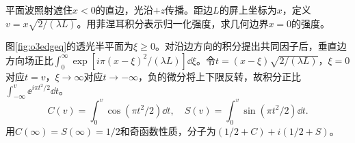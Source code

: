 \begin{example}\label{ex:o3edge}
平面波照射遮住$x<0$的直边，光沿$+z$传播。距边$L$的屏上坐标为$x$，定义$v=x\sqrt{2/(\lambda L)}$。用菲涅耳积分表示归一化强度，求几何边界$x=0$的强度。
\end{example}
\begin{solution}
图\ref{fig:o3edgeq}的透光半平面为$\xi\geq0$。对沿边方向的积分提出共同因子后，垂直边方向场正比$\int_0^\infty\exp[i\pi(x-\xi)^2/(\lambda L)]\dd\xi$。令$t=(x-\xi)\sqrt{2/(\lambda L)}$，$\xi=0$对应$t=v$，$\xi\to\infty$对应$t\to-\infty$，负的微分将上下限反转，故积分正比$\int_{-\infty}^v\ee^{i\pi t^2/2}\dd t$。
\[
 C(v)=\int_0^v\cos(\pi t^2/2)\dd t,\quad
 S(v)=\int_0^v\sin(\pi t^2/2)\dd t.
\]
用$C(\infty)=S(\infty)=1/2$和奇函数性质，分子为$(1/2+C)+i(1/2+S)$。

\end{solution}
